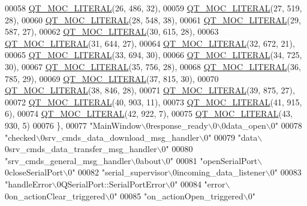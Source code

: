 \begin{DoxyCode}
00058 \hyperlink{a00066_a75bb9482d242cde0a06c9dbdc6b83abe}{QT\_MOC\_LITERAL}(26, 486, 32),
00059 \hyperlink{a00066_a75bb9482d242cde0a06c9dbdc6b83abe}{QT\_MOC\_LITERAL}(27, 519, 28),
00060 \hyperlink{a00066_a75bb9482d242cde0a06c9dbdc6b83abe}{QT\_MOC\_LITERAL}(28, 548, 38),
00061 \hyperlink{a00066_a75bb9482d242cde0a06c9dbdc6b83abe}{QT\_MOC\_LITERAL}(29, 587, 27),
00062 \hyperlink{a00066_a75bb9482d242cde0a06c9dbdc6b83abe}{QT\_MOC\_LITERAL}(30, 615, 28),
00063 \hyperlink{a00066_a75bb9482d242cde0a06c9dbdc6b83abe}{QT\_MOC\_LITERAL}(31, 644, 27),
00064 \hyperlink{a00066_a75bb9482d242cde0a06c9dbdc6b83abe}{QT\_MOC\_LITERAL}(32, 672, 21),
00065 \hyperlink{a00066_a75bb9482d242cde0a06c9dbdc6b83abe}{QT\_MOC\_LITERAL}(33, 694, 30),
00066 \hyperlink{a00066_a75bb9482d242cde0a06c9dbdc6b83abe}{QT\_MOC\_LITERAL}(34, 725, 30),
00067 \hyperlink{a00066_a75bb9482d242cde0a06c9dbdc6b83abe}{QT\_MOC\_LITERAL}(35, 756, 28),
00068 \hyperlink{a00066_a75bb9482d242cde0a06c9dbdc6b83abe}{QT\_MOC\_LITERAL}(36, 785, 29),
00069 \hyperlink{a00066_a75bb9482d242cde0a06c9dbdc6b83abe}{QT\_MOC\_LITERAL}(37, 815, 30),
00070 \hyperlink{a00066_a75bb9482d242cde0a06c9dbdc6b83abe}{QT\_MOC\_LITERAL}(38, 846, 28),
00071 \hyperlink{a00066_a75bb9482d242cde0a06c9dbdc6b83abe}{QT\_MOC\_LITERAL}(39, 875, 27),
00072 \hyperlink{a00066_a75bb9482d242cde0a06c9dbdc6b83abe}{QT\_MOC\_LITERAL}(40, 903, 11),
00073 \hyperlink{a00066_a75bb9482d242cde0a06c9dbdc6b83abe}{QT\_MOC\_LITERAL}(41, 915, 6),
00074 \hyperlink{a00066_a75bb9482d242cde0a06c9dbdc6b83abe}{QT\_MOC\_LITERAL}(42, 922, 7),
00075 \hyperlink{a00066_a75bb9482d242cde0a06c9dbdc6b83abe}{QT\_MOC\_LITERAL}(43, 930, 5)
00076     \},
00077     \textcolor{stringliteral}{"MainWindow\(\backslash\)0response\_ready\(\backslash\)0\(\backslash\)0data\_open\(\backslash\)0"}
00078     \textcolor{stringliteral}{"checked\(\backslash\)0srv\_cmds\_data\_download\_msg\_handler\(\backslash\)0"}
00079     \textcolor{stringliteral}{"data\(\backslash\)0srv\_cmds\_data\_transfer\_msg\_handler\(\backslash\)0"}
00080     \textcolor{stringliteral}{"srv\_cmds\_general\_msg\_handler\(\backslash\)0about\(\backslash\)0"}
00081     \textcolor{stringliteral}{"openSerialPort\(\backslash\)0closeSerialPort\(\backslash\)0"}
00082     \textcolor{stringliteral}{"serial\_supervisor\(\backslash\)0incoming\_data\_listener\(\backslash\)0"}
00083     \textcolor{stringliteral}{"handleError\(\backslash\)0QSerialPort::SerialPortError\(\backslash\)0"}
00084     \textcolor{stringliteral}{"error\(\backslash\)0on\_actionClear\_triggered\(\backslash\)0"}
00085     \textcolor{stringliteral}{"on\_actionOpen\_triggered\(\backslash\)0"}

\end{DoxyCode}
